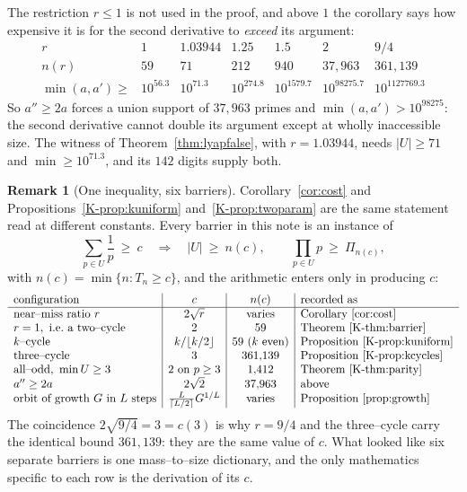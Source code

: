 \documentclass[11pt]{article}
\theoremstyle{definition}
\newtheorem{remark}[theorem]{Remark}
\begin{document}
The restriction $r\le1$ is not used in the proof, and above $1$ the corollary says how expensive it
is for the second derivative to \emph{exceed} its argument:
\[
\begin{array}{l|cccccc}
r & 1 & 1.03944 & 1.25 & 1.5 & 2 & 9/4\\\hline
n(r) & 59 & 71 & 212 & 940 & 37{,}963 & 361{,}139\\
\min(a,a')\ge & 10^{56.3} & 10^{71.3} & 10^{274.8} & 10^{1579.7} & 10^{98275.7} & 10^{1127769.3}
\end{array}
\]
So $a''\ge2a$ forces a union support of $37{,}963$ primes and $\min(a,a')>10^{98275}$: the second
derivative cannot double its argument except at wholly inaccessible size. The witness of
Theorem~\ref{thm:lyapfalse}, with $r=1.03944$, needs $|U|\ge71$ and $\min\ge10^{71.3}$, and its $142$
digits supply both.

\begin{remark}[One inequality, six barriers]\label{rem:dictionary}
Corollary~\ref{cor:cost} and Propositions~\ref{K-prop:kuniform} and~\ref{K-prop:twoparam} are the same
statement read at different constants. Every barrier in this note is an instance of
\[ \sum_{p\in U}\frac1p\ \ge\ c \quad\Longrightarrow\quad |U|\ \ge\ n(c),\qquad \prod_{p\in U}p\ \ge\
\Pi_{n(c)}, \]
with $n(c)=\min\{n:T_n\ge c\}$, and the arithmetic enters only in producing $c$:
\[
\begin{array}{l|c|c|l}
\text{configuration} & c & n(c) & \text{recorded as}\\\hline
\text{near--miss ratio }r & 2\sqrt r & \text{varies} & \text{Corollary~\ref{cor:cost}}\\
r=1,\ \text{i.e.\ a two--cycle} & 2 & 59 & \text{Theorem~\ref{K-thm:barrier}}\\
k\text{--cycle} & k/\lfloor k/2\rfloor & 59\ (k\text{ even}) & \text{Proposition~\ref{K-prop:kuniform}}\\
\text{three--cycle} & 3 & 361{,}139 & \text{Proposition~\ref{K-prop:kcycles}}\\
\text{all--odd, }\min U\ge3 & 2\ \text{on }p\ge3 & 1{,}412 & \text{Theorem~\ref{K-thm:parity}}\\
a''\ge2a & 2\sqrt2 & 37{,}963 & \text{above}\\
\text{orbit of growth }G\text{ in }L\text{ steps} & \tfrac{L}{\lceil L/2\rceil}G^{1/L} &
 \text{varies} & \text{Proposition~\ref{prop:growth}}
\end{array}
\]
The coincidence $2\sqrt{9/4}=3=c(3)$ is why $r=9/4$ and the three--cycle carry the identical bound
$361{,}139$: they are the same value of $c$. What looked like six separate barriers is one
mass--to--size dictionary, and the only mathematics specific to each row is the derivation of its
$c$.
\end{remark}
\end{document}
